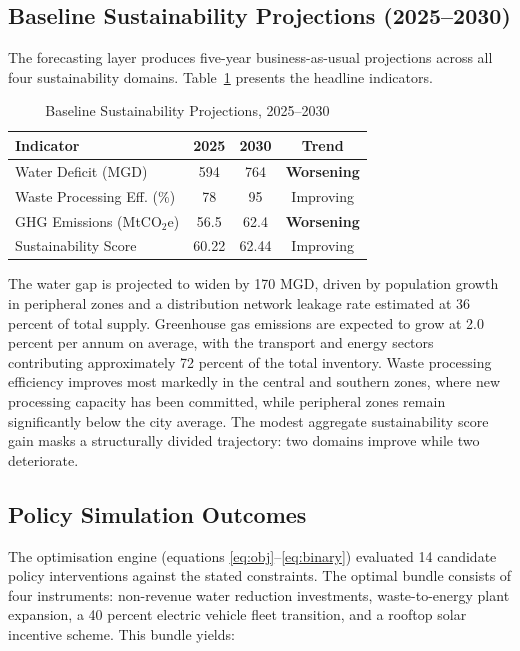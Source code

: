 \documentclass[conference]{IEEEtran}
\begin{document}
\subsection{Baseline Sustainability Projections (2025--2030)}

The forecasting layer produces five-year business-as-usual projections
across all four sustainability domains. Table~\ref{tab:baseline}
presents the headline indicators.

\begin{table}[htbp]
\caption{Baseline Sustainability Projections, 2025--2030}
\label{tab:baseline}
\begin{center}
\begin{tabular}{|l|c|c|c|}
\hline
\textbf{Indicator} & \textbf{2025} & \textbf{2030} & \textbf{Trend} \\
\hline
Water Deficit (MGD)       & 594   & 764   & \textbf{Worsening} \\
Waste Processing Eff. (\%)& 78    & 95    & Improving \\
GHG Emissions (MtCO$_2$e) & 56.5  & 62.4  & \textbf{Worsening} \\
Sustainability Score      & 60.22 & 62.44 & Improving \\
\hline
\end{tabular}
\end{center}
\end{table}

The water gap is projected to widen by 170 MGD, driven by population
growth in peripheral zones and a distribution network leakage rate
estimated at 36 percent of total supply. Greenhouse gas emissions are
expected to grow at 2.0 percent per annum on average, with the transport
and energy sectors contributing approximately 72 percent of the total
inventory. Waste processing efficiency improves most markedly in the
central and southern zones, where new processing capacity has been
committed, while peripheral zones remain significantly below the city
average. The modest aggregate sustainability score gain masks a
structurally divided trajectory: two domains improve while two
deteriorate.

\subsection{Policy Simulation Outcomes}

The optimisation engine (equations \eqref{eq:obj}--\eqref{eq:binary})
evaluated 14 candidate policy interventions against the stated
constraints. The optimal bundle consists of four instruments:
non-revenue water reduction investments, waste-to-energy plant
expansion, a 40 percent electric vehicle fleet transition, and a
rooftop solar incentive scheme. This bundle yields:
\end{document}
